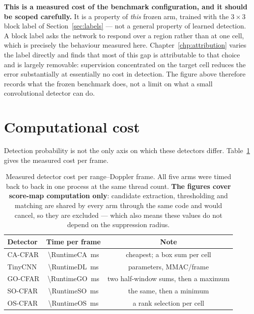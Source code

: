 \textbf{This is a measured cost of the benchmark configuration, and it should be scoped carefully.}
It is a property of \emph{this} frozen arm, trained with the $3\times3$ block label of
Section~\ref{sec:labels} --- not a general property of learned detection. A block label asks the
network to respond over a region rather than at one cell, which is precisely the behaviour measured
here. Chapter~\ref{chp:attribution} varies the label directly and finds that most of this gap is
attributable to that choice and is largely removable: supervision concentrated on the target cell
reduces the error substantially at essentially no cost in detection. The figure above therefore
records what the frozen benchmark does, not a limit on what a small convolutional detector can do.

\section{Computational cost}

Detection probability is not the only axis on which these detectors differ.
Table~\ref{tab:runtime} gives the measured cost per frame.

\begin{table}[H]
\centering
\caption{Measured detector cost per range--Doppler frame. All five arms were timed back to back in
one process at the same thread count. \textbf{The figures cover score-map computation only}:
candidate extraction, thresholding and matching are shared by every arm through the same code and
would cancel, so they are excluded --- which also means these values do not depend on the
suppression radius.}
\label{tab:runtime}
\begin{tabular}{@{}lcc@{}}
\toprule
\textbf{Detector} & \textbf{Time per frame} & \textbf{Note} \\
\midrule
CA-CFAR & \SI{\RuntimeCA}{\milli\second} & cheapest; a box sum per cell \\
TinyCNN & \SI{\RuntimeDL}{\milli\second} & \TinyParams{} parameters, \RuntimeMMac{} MMAC/frame \\
GO-CFAR & \SI{\RuntimeGO}{\milli\second} & two half-window sums, then a maximum \\
SO-CFAR & \SI{\RuntimeSO}{\milli\second} & the same, then a minimum \\
OS-CFAR & \SI{\RuntimeOS}{\milli\second} & a rank selection per cell \\
\bottomrule
\end{tabular}
\end{table}

